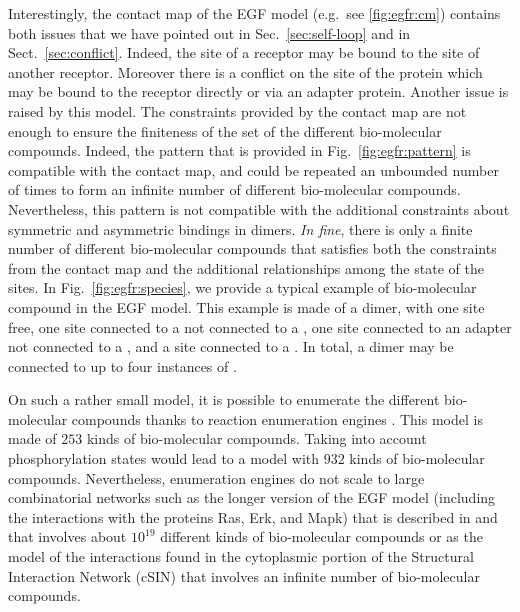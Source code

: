 \documentclass{entcs}
\begin{document}
Interestingly, the contact map of the EGF model (e.g.~see \ref{fig:egfr:cm})
contains both issues that we have pointed out in Sec.~\ref{sec:self-loop} and in Sect.~\ref{sec:conflict}. Indeed, the site  of a receptor may be bound to the site  of another receptor. Moreover there is a conflict on the site  of the protein  which may be bound to the receptor directly
or via an adapter protein. Another issue is raised by this model.
The constraints provided by the contact map are not enough to ensure the finiteness of the set of the different bio-molecular compounds. Indeed,
the pattern that is provided in Fig.~\ref{fig:egfr:pattern} is compatible with the contact map, and could be repeated an unbounded number of times to form an infinite number of different bio-molecular compounds. Nevertheless, this pattern is not compatible with the additional constraints about symmetric and asymmetric bindings in dimers. \emph{In fine}, there is only a finite number of different bio-molecular compounds that satisfies both
the constraints from the contact map and the additional relationships among the state of the sites. In Fig.~\ref{fig:egfr:species}, we provide a typical example of bio-molecular compound in the EGF model. This example is made of a dimer, with one site  free, one site  connected to a  not connected to a , one site  connected to an adapter not connected to a , and a site  connected to a . In total, a dimer may be connected to up to four instances of .

On such a rather small model, it is possible to enumerate the different bio-molecular compounds thanks to reaction enumeration engines  \cite{BNGL,KaDe}. This model is made of $253$ kinds of bio-molecular compounds.
Taking into account phosphorylation states would lead to a model
with $932$ kinds of bio-molecular compounds. Nevertheless, enumeration engines do not scale to large combinatorial networks such as the longer version of the EGF model (including the interactions with the proteins Ras, Erk, and Mapk) that is described in \cite{DanosEtAl-CONCUR07} and that involves about $10^{19}$ different kinds of bio-molecular compounds \cite{DanosEtAl-VMCAI08} or as the model of the interactions found in the cytoplasmic portion of the Structural Interaction Network (cSIN) \cite{Deeds-et-al-plosone2012,Kim} that involves an infinite number of bio-molecular compounds.
\end{document}
